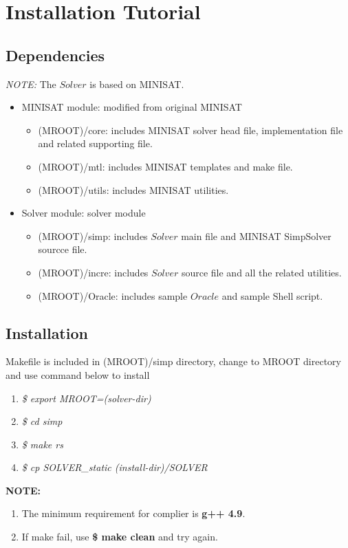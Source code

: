 \documentclass[thesis]{umassthesis}  %
\begin{document}
\section{Installation Tutorial}
	\subsection{Dependencies}
	\emph{NOTE:} The $Solver$ is based on MINISAT.
	\begin{itemize}
			\item MINISAT module: modified from original MINISAT
				\begin{itemize}
					\item (MROOT)/core: includes MINISAT solver head file, implementation file and related supporting file.
					\item (MROOT)/mtl: includes MINISAT templates and make file.
					\item (MROOT)/utils: includes MINISAT utilities.
				\end{itemize}
			\item Solver module: solver module
				\begin{itemize}
					\item (MROOT)/simp: includes $Solver$ main file and MINISAT SimpSolver sourcce file.
					\item (MROOT)/incre: includes $Solver$ source file and all the related utilities.
					\item (MROOT)/Oracle: includes sample $Oracle$ and sample Shell script.
				\end{itemize}
	\end{itemize}



	\subsection{Installation}
		Makefile is included in (MROOT)/simp directory, change to MROOT directory and use command below to install
		\begin{enumerate}
			\item \emph{\$ export MROOT=(solver-dir)}	
			\item \emph{\$ cd simp}
			\item \emph{\$ make rs}
			\item \emph{\$ cp SOLVER\_static (install-dir)/SOLVER}
		\end{enumerate}
		\textbf{NOTE:} 
		\begin{enumerate}
			\item The minimum requirement for complier is \textbf{g++ 4.9}.
			\item If make fail, use \textbf{\$ make clean} and try again.
		\end{enumerate}
\end{document}
